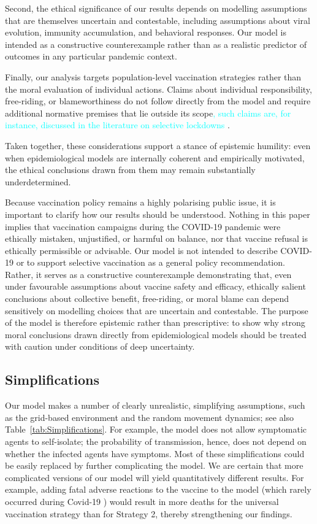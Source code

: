 \documentclass[a4paper,12pt]{article}
\newcommand{\juergen}[1]{\textcolor{cyan}{#1}}
\begin{document}
Second, the ethical significance of our results depends on modelling assumptions that are themselves uncertain and contestable, including assumptions about viral evolution, immunity accumulation, and behavioral responses. Our model is intended as a constructive counterexample rather than as a realistic predictor of outcomes in any particular pandemic context.

Finally, our analysis targets population-level vaccination strategies rather than the moral evaluation of individual actions. Claims about individual responsibility, free-riding, or blameworthiness do not follow directly from the model and require additional normative premises that lie outside its scope\juergen{, such claims are, for instance, discussed in the literature on selective lockdowns \cite{Cameron2021,Giubilini2021a,Savulescu2020a}}.

Taken together, these considerations support a stance of epistemic humility: even when epidemiological models are internally coherent and empirically motivated, the ethical conclusions drawn from them may remain substantially underdetermined.

Because vaccination policy remains a highly polarising public issue, it is important to clarify how our results should be understood. Nothing in this paper implies that vaccination campaigns during the COVID-19 pandemic were ethically mistaken, unjustified, or harmful on balance, nor that vaccine refusal is ethically permissible or advisable. Our model is not intended to describe COVID-19 or to support selective vaccination as a general policy recommendation. Rather, it serves as a constructive counterexample demonstrating that, even under favourable assumptions about vaccine safety and efficacy, ethically salient conclusions about collective benefit, free-riding, or moral blame can depend sensitively on modelling choices that are uncertain and contestable. The purpose of the model is therefore epistemic rather than prescriptive: to show why strong moral conclusions drawn directly from epidemiological models should be treated with caution under conditions of deep uncertainty.

\subsection{Simplifications}\label{subsec:Simple}
Our model makes a number of clearly unrealistic, simplifying assumptions, such as the grid-based environment and the random movement dynamics; see also Table~\ref{tab:Simplifications}. For example, the model does not allow symptomatic agents to self-isolate; the probability of transmission, hence, does not depend on whether the infected agents have symptoms. Most of these simplifications could be easily replaced by further complicating the model. We are certain that more complicated versions of our model will yield quantitatively different results. For example, adding fatal adverse reactions to the vaccine to the model (which rarely occurred during Covid-19 \cite{Sessa2021}) would result in more deaths for the universal vaccination strategy than for Strategy 2, thereby strengthening our findings.
\end{document}
